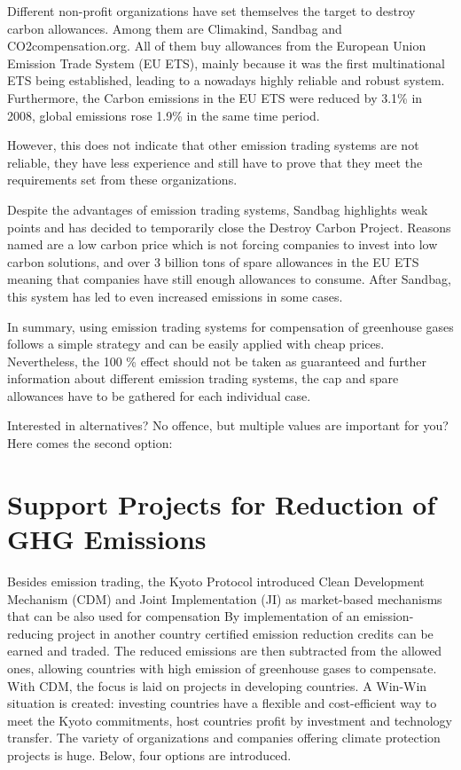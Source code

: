 Different non-profit organizations have set themselves the target to destroy carbon allowances. Among them are Climakind, Sandbag and CO2compensation.org. 
All of them buy allowances from the European Union Emission Trade System (EU ETS), mainly because it was the first multinational ETS being established, leading to a nowadays highly reliable and robust system. Furthermore, the Carbon emissions in the EU ETS were reduced by 3.1\% in 2008, global emissions rose 1.9\% in the same time period. 
\cite{climakind_2} %

However, this does not indicate that other emission trading systems are not reliable, they have less experience and still have to prove that they meet the requirements set from these organizations. 

Despite the advantages of emission trading systems, Sandbag highlights weak points and has decided to temporarily close the Destroy Carbon Project. Reasons named are a low carbon price which is not forcing companies to invest into low carbon solutions, and over 3 billion tons of spare allowances in the EU ETS meaning that companies have still enough allowances to consume. After Sandbag, this system has led to even increased emissions in some cases. \cite{sandbag}


In summary, using emission trading systems for compensation of greenhouse gases follows a simple strategy and can be easily applied with cheap prices. Nevertheless, the 100 \% effect should not be taken as guaranteed and further information about different emission trading systems, the cap and spare allowances have to be gathered for each individual case. 


Interested in alternatives? No offence, but multiple values are important for you? Here comes the second option:

\section{Support Projects for Reduction of GHG Emissions}	

Besides emission trading, the Kyoto Protocol introduced Clean Development Mechanism (CDM) and Joint Implementation (JI) as market-based mechanisms that can be also used for compensation \cite{unfccc} %
By implementation of an emission-reducing project in another country certified emission reduction credits can be earned and traded. The reduced emissions are then subtracted from the allowed ones, allowing countries with high emission of greenhouse gases to compensate. With CDM, the focus is laid on projects in developing countries. A Win-Win situation is created: investing countries have a flexible and cost-efficient way to meet the Kyoto commitments, host countries profit by investment and technology transfer.
The variety of organizations and companies offering climate protection projects is huge. Below, four options are introduced.

